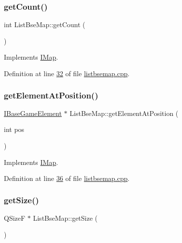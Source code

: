 \subsubsection{\texorpdfstring{get\+Count()}{getCount()}}
{\footnotesize\ttfamily int List\+Bse\+Map\+::get\+Count (\begin{DoxyParamCaption}{ }\end{DoxyParamCaption})\hspace{0.3cm}{\ttfamily [virtual]}}



Implements \hyperlink{a00165_a021e64b05ecb6558ed1d663676f82971}{I\+Map}.



Definition at line \hyperlink{a00062_source_l00032}{32} of file \hyperlink{a00062_source}{listbsemap.\+cpp}.

\mbox{\label{a00169_a6725c6e4231705df32b1074b0b5fdda5}} 
\subsubsection{\texorpdfstring{get\+Element\+At\+Position()}{getElementAtPosition()}}
{\footnotesize\ttfamily \hyperlink{a00137}{I\+Base\+Game\+Element} $\ast$ List\+Bse\+Map\+::get\+Element\+At\+Position (\begin{DoxyParamCaption}\item[{int}]{pos }\end{DoxyParamCaption})\hspace{0.3cm}{\ttfamily [virtual]}}



Implements \hyperlink{a00165_a9fce1fb4ad8fac181fbbce3ce31da0a0}{I\+Map}.



Definition at line \hyperlink{a00062_source_l00036}{36} of file \hyperlink{a00062_source}{listbsemap.\+cpp}.

\mbox{\label{a00169_ae58cec494eba5e73b55bfb2f68fc3b52}} 
\subsubsection{\texorpdfstring{get\+Size()}{getSize()}}
{\footnotesize\ttfamily Q\+SizeF $\ast$ List\+Bse\+Map\+::get\+Size (\begin{DoxyParamCaption}{ }\end{DoxyParamCaption})\hspace{0.3cm}{\ttfamily [virtual]}}



